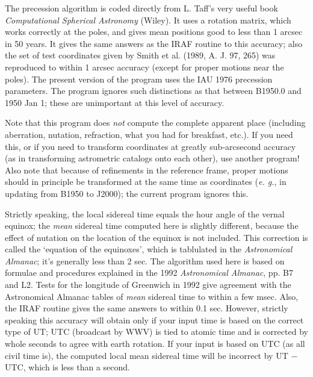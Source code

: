 The precession algorithm is coded directly from L. Taff's very 
useful book {\it Computational Spherical Astronomy} (Wiley).  It uses
a rotation matrix, which works correctly at the poles,
and gives mean positions good to less than
1 arcsec in 50 years.
It gives the same answers as the IRAF routine to this accuracy;  
also the set of test coordinates given by Smith et al. 
(1989, A. J. 97, 265) was reproduced to within 1 arcsec accuracy 
(except for proper motions near the poles).  The present version of the 
program uses the IAU 1976 precession parameters.  The program ignores such
distinctions as that between B1950.0 and 1950 Jan 1; these are unimportant
at this level of accuracy. 
\par
Note that this program does {\it not} compute the complete apparent place
(including aberration, nutation, refraction, what you had for 
breakfast, etc.). If you need this, or if you need to transform 
coordinates at greatly sub-arcsecond accuracy (as in transforming 
astrometric catalogs onto each other), use another program!   
Also note that because of refinements in the reference frame, 
proper motions should in principle be transformed at the same time as
coordinates ({\it e. g.}, in updating from B1950 to J2000); the current
program ignores this.
\par
{}
\par
Strictly speaking, the local sidereal time equals the hour angle of the 
vernal equinox; the {\it mean} sidereal time computed here is slightly 
different, because the effect of nutation on the location of the equinox 
is not included.  This correction is called the `equation of the equinoxes', 
which is tablulated in the {\it Astronomical Almanac}; it's generally 
less than 2 sec. The algorithm used here is based on formulae and 
procedures explained in the 1992  {\it Astronomical Almanac}, pp. B7 and L2.
Tests for the longitude of Greenwich in 1992 give agreement with the 
Astronomical Almanac tables of {\it mean} sidereal time to within a few msec. 
Also, the IRAF routine gives the same answers to within 0.1 sec.  However,
strictly speaking this accuracy will obtain only if your input time is based 
on the correct type of UT; UTC (broadcast by WWV) is tied to atomic time
and is corrected by whole seconds to agree with earth rotation.  If your 
input is based on UTC (as all civil time is), the computed local mean 
sidereal time will be incorrect by UT $-$ UTC, which is less than a second.
\par
{}
